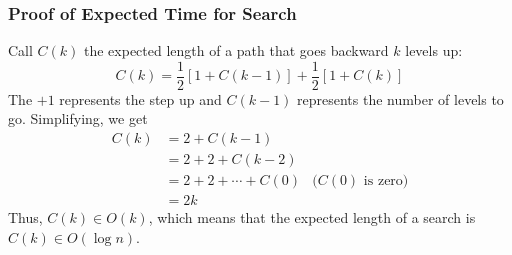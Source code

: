 \documentclass{report}
\begin{document}
\subsubsection{Proof of Expected Time for Search}
Call $C(k)$ the expected length of a path that goes backward $k$ levels up: $$C(k) = \frac{1}{2}[1 + C(k-1)] + \frac{1}{2}[1+C(k)]$$
The $+1$ represents the step up and $C(k-1)$ represents the number of levels to go. Simplifying, we get
\begin{align*}
C(k) &= 2 + C(k-1) \\
&= 2 + 2 + C(k-2) \\
&= 2 + 2 + \cdots + C(0) & (C(0)\text{ is zero)} \\
&= 2k
\end{align*}
Thus, $C(k) \in O(k)$, which means that the expected length of a search is $C(k) \in O(\log n)$.
\end{document}
